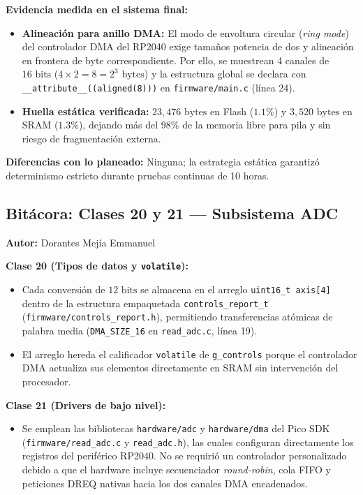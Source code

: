 \textbf{Evidencia medida en el sistema final:}
\begin{itemize}
	\item \textbf{Alineación para anillo DMA:} El modo de envoltura circular (\textit{ring mode}) del controlador DMA del RP2040 exige tamaños potencia de dos y alineación en frontera de byte correspondiente. Por ello, se muestrean 4 canales de $16\text{ bits}$ ($4 \times 2 = 8 = 2^3\text{ bytes}$) y la estructura global se declara con \texttt{\_\_attribute\_\_((aligned(8)))} en \texttt{firmware/main.c} (línea 24).
	\item \textbf{Huella estática verificada:} $23{,}476\text{ bytes}$ en Flash ($1.1\%$) y $3{,}520\text{ bytes}$ en SRAM ($1.3\%$), dejando más del $98\%$ de la memoria libre para pila y sin riesgo de fragmentación externa.
\end{itemize}

\textbf{Diferencias con lo planeado:} Ninguna; la estrategia estática garantizó determinismo estricto durante pruebas continuas de 10 horas.

\subsection{Bitácora: Clases 20 y 21 — Subsistema ADC}
\textbf{Autor:} Dorantes Mejía Emmanuel

\textbf{Clase 20 (Tipos de datos y \texttt{volatile}):}
\begin{itemize}
	\item Cada conversión de $12\text{ bits}$ se almacena en el arreglo \texttt{uint16\_t axis[4]} dentro de la estructura empaquetada \texttt{controls\_report\_t} (\texttt{firmware/controls\_report.h}), permitiendo transferencias atómicas de palabra media (\texttt{DMA\_SIZE\_16} en \texttt{read\_adc.c}, línea 19).
	\item El arreglo hereda el calificador \texttt{volatile} de \texttt{g\_controls} porque el controlador DMA actualiza sus elementos directamente en SRAM sin intervención del procesador.
\end{itemize}

\textbf{Clase 21 (Drivers de bajo nivel):}
\begin{itemize}
	\item Se emplean las bibliotecas \texttt{hardware/adc} y \texttt{hardware/dma} del Pico SDK (\texttt{firmware/read\_adc.c} y \texttt{read\_adc.h}), las cuales configuran directamente los registros del periférico RP2040. No se requirió un controlador personalizado debido a que el hardware incluye secuenciador \textit{round-robin}, cola FIFO y peticiones DREQ nativas hacia los dos canales DMA encadenados.
\end{itemize}